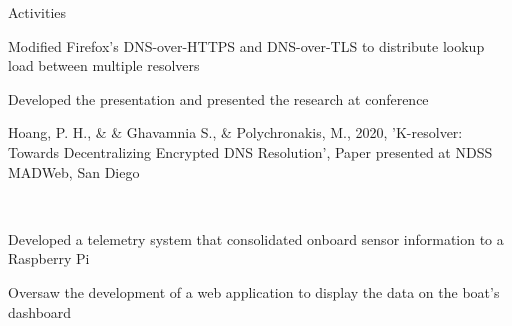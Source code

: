 \documentclass[]{deedy-resume-openfont}
\begin{document}
\begin{resumesection}{Activities}
\newline
{}\hfill{}
\vspace{-5pt}
\begin{tightemize}
    \item Modified Firefox's DNS-over-HTTPS and DNS-over-TLS to distribute lookup load between multiple resolvers
    \item Developed the presentation and presented the research at conference
    \item Hoang, P. H., \&  \& Ghavamnia S., \& Polychronakis, M., 2020, 'K-resolver: Towards Decentralizing Encrypted DNS Resolution', Paper presented at NDSS MADWeb, San Diego
    \iffalse
    \item Tested and compared the results of semisupervised generative adversarial networks to traditional GANs and discriminator convolutional neural nets
    \fi
\end{tightemize}
\vspace{-2pt}
\hfill{}\\
\vspace{2pt}
\iffalse
\descript{Teaching Assistant: Introduction to Stony Brook}\hfill\location{July 2017 - December 2017}
\sectionsep
\vspace{-5pt}\\
\fi
{}\newline
\iffalse
\descript{Vice President}\hfill\location{September 2018 - Present}
\vspace{-5pt}
\begin{tightemize}
    \item Scheduled meetings, met with advisors and funding sources, and supervised general body members
\end{tightemize}
\fi
{}
\vspace{-5pt}
\begin{tightemize}
    \item Developed a telemetry system that consolidated onboard sensor information to a Raspberry Pi
    \item Oversaw the development of a web application to display the data on the boat's dashboard
\end{tightemize}

\vspace{-4pt}
\end{resumesection}
\end{document}
